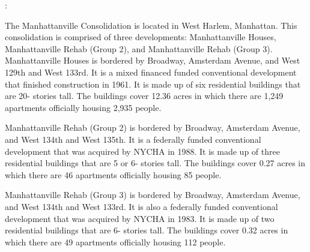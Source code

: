 :   

 

The Manhattanville Consolidation is located in West Harlem, Manhattan. This consolidation is comprised of three developments: Manhattanville Houses, Manhattanville Rehab (Group 2), and Manhattanville Rehab (Group 3). Manhattanville Houses is bordered by Broadway, Amsterdam Avenue, and West 129th and West 133rd. It is a mixed financed funded conventional development that finished construction in 1961. It is made up of six residential buildings that are 20- stories tall. The buildings cover 12.36 acres in which there are 1,249 apartments officially housing 2,935 people.    

   

Manhattanville Rehab (Group 2) is bordered by Broadway, Amsterdam Avenue, and West 134th and West 135th. It is a federally funded conventional development that was acquired by NYCHA in 1988. It is made up of three residential buildings that are 5 or 6- stories tall. The buildings cover 0.27 acres in which there are 46 apartments officially housing 85 people.    

Manhattanville Rehab (Group 3) is bordered by Broadway, Amsterdam Avenue, and West 134th and West 133rd. It is also a federally funded conventional development that was acquired by NYCHA in 1983. It is made up of two residential buildings that are 6- stories tall. The buildings cover 0.32 acres in which there are 49 apartments officially housing 112 people.        